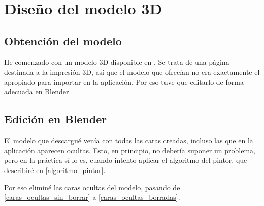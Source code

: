 \documentclass[a4paper,12pt]{article}
\begin{document}
\section{Diseño del modelo 3D}

\subsection{Obtención del modelo}

He comenzado con un modelo 3D disponible en \cite{modeloTriangulo}. Se trata de una página destinada a la impresión 3D, así que el modelo que ofrecían no era exactamente el apropiado para importar en la aplicación. Por eso tuve que editarlo de forma adecuada en Blender.

\subsection{Edición en Blender}

El modelo que descargué venía con todas las caras creadas, incluso las que en la aplicación aparecen ocultas. Esto, en principio, no debería suponer un problema, pero en la práctica sí lo es, cuando intento aplicar el algoritmo del pintor, que describiré en \ref{algoritmo_pintor}.

Por eso eliminé las caras ocultas del modelo, pasando de \ref{caras_ocultas_sin_borrar} a \ref{caras_ocultas_borradas}.
\end{document}
